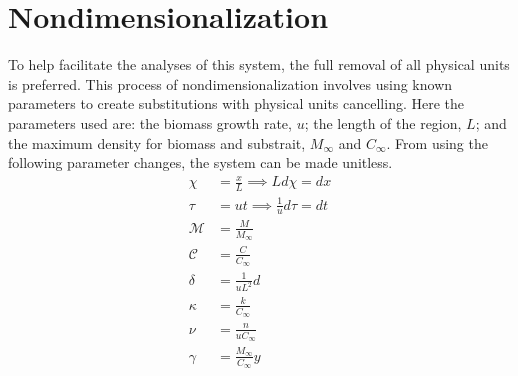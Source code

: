 \section{Nondimensionalization}
 
To help facilitate the analyses of this system, the full removal of all physical units is preferred. 
This process of nondimensionalization involves using known parameters to create substitutions with physical units cancelling.
Here the parameters used are: the biomass growth rate, $u$; the length of the region, $L$; and the maximum density for biomass and substrait, $M_\infty$ and $C_\infty$.
From using the following parameter changes, the system can be made unitless.
\begin{align}
  \chi &= \frac{x}{L} \implies L d\chi= dx \\
  \tau &= u t \implies \frac{1}{u} d\tau= dt \\
  \mathcal{M} &= \frac{M}{M_{\infty}} \\
  \mathcal{C} &= \frac{C}{C_{\infty}} \\
  \delta &= \frac{1}{u L^2} d \\
  \kappa &= \frac{k}{C_\infty} \\
  \nu &= \frac{n}{u C_\infty} \\
  \gamma &= \frac{M_\infty}{C_\infty} y
\end{align}

